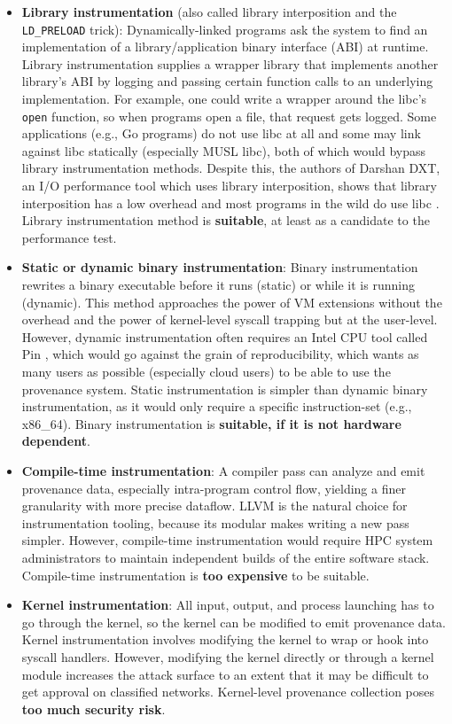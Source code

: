 \begin{itemize}
\item \textbf{Library instrumentation} (also called library interposition and the \texttt{LD\_PRELOAD} trick):
Dynamically-linked programs ask the system to find an implementation of a library/application binary interface (ABI) at runtime.
Library instrumentation supplies a wrapper library that implements another library's ABI by logging and passing certain function calls to an underlying implementation.
For example, one could write a wrapper around the libc's \texttt{open} function, so when programs open a file, that request gets logged.
Some applications (e.g., Go programs) do not use libc at all and some may link against libc statically (especially MUSL libc), both of which would bypass library instrumentation methods.
Despite this, the authors of Darshan DXT, an I/O performance tool which uses library interposition, shows that library interposition has a low overhead and most programs in the wild do use libc \cite{xu_dxt_2017}.
Library instrumentation method is \textbf{suitable}, at least as a candidate to the performance test.

\item \textbf{Static or dynamic binary instrumentation}:
Binary instrumentation rewrites a binary executable before it runs (static) or while it is running (dynamic).
This method approaches the power of VM extensions without the overhead and the power of kernel-level syscall trapping but at the user-level.
However, dynamic instrumentation often requires an Intel CPU tool called Pin \cite{luk_pin_2005}, which would go against the grain of reproducibility, which wants as many users as possible (especially cloud users) to be able to use the provenance system.
Static instrumentation is simpler than dynamic binary instrumentation, as it would only require a specific instruction-set (e.g., x86\_64).
Binary instrumentation is \textbf{suitable, if it is not hardware dependent}.

\item \textbf{Compile-time instrumentation}:
A compiler pass can analyze and emit provenance data, especially intra-program control flow, yielding a finer granularity with more precise dataflow.
LLVM is the natural choice for instrumentation tooling, because its modular makes writing a new pass simpler.
However, compile-time instrumentation would require HPC system administrators to maintain independent builds of the entire software stack.
Compile-time instrumentation is \textbf{too expensive} to be suitable.

\item \textbf{Kernel instrumentation}:
All input, output, and process launching has to go through the kernel, so the kernel can be modified to emit provenance data.
Kernel instrumentation involves modifying the kernel to wrap or hook into syscall handlers.
However, modifying the kernel directly or through a kernel module increases the attack surface to an extent that it may be difficult to get approval on classified networks.
Kernel-level provenance collection poses \textbf{too much security risk}.


\end{itemize}
